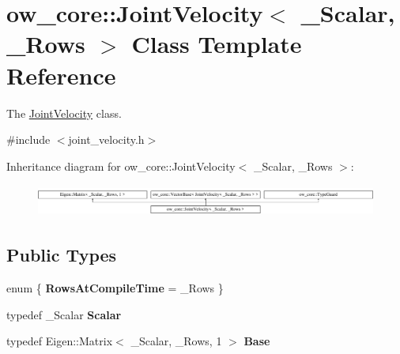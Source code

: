 \hypertarget{classow__core_1_1JointVelocity}{}\section{ow\+\_\+core\+:\+:Joint\+Velocity$<$ \+\_\+\+Scalar, \+\_\+\+Rows $>$ Class Template Reference}
\label{classow__core_1_1JointVelocity}


The \hyperlink{classow__core_1_1JointVelocity}{Joint\+Velocity} class.  




{\ttfamily \#include $<$joint\+\_\+velocity.\+h$>$}

Inheritance diagram for ow\+\_\+core\+:\+:Joint\+Velocity$<$ \+\_\+\+Scalar, \+\_\+\+Rows $>$\+:\begin{figure}[H]
\begin{center}
\leavevmode
\includegraphics[height=1.060606cm]{da/d5f/classow__core_1_1JointVelocity}
\end{center}
\end{figure}
\subsection*{Public Types}
\begin{DoxyCompactItemize}
\item 
enum \{ {\bfseries Rows\+At\+Compile\+Time} = \+\_\+\+Rows
 \}\hypertarget{classow__core_1_1JointVelocity_a1bd6411d047fe752a8e2a19c90f23e4c}{}\label{classow__core_1_1JointVelocity_a1bd6411d047fe752a8e2a19c90f23e4c}

\item 
typedef \+\_\+\+Scalar {\bfseries Scalar}\hypertarget{classow__core_1_1JointVelocity_a4e972bf4b9e3204bd9074f3f22f9bef2}{}\label{classow__core_1_1JointVelocity_a4e972bf4b9e3204bd9074f3f22f9bef2}

\item 
typedef Eigen\+::\+Matrix$<$ \+\_\+\+Scalar, \+\_\+\+Rows, 1 $>$ {\bfseries Base}\hypertarget{classow__core_1_1JointVelocity_a1fc6ccd6c7fe5a168bc70c94744cb1fe}{}\label{classow__core_1_1JointVelocity_a1fc6ccd6c7fe5a168bc70c94744cb1fe}

\end{DoxyCompactItemize}
